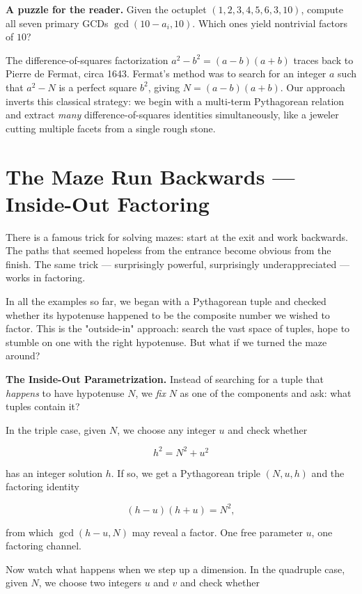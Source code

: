 \textbf{A puzzle for the reader.} Given the octuplet $(1, 2, 3, 4, 5, 6, 3, 10)$, compute all seven primary GCDs $\gcd(10 - a_i, 10)$. Which ones yield nontrivial factors of $10$?

The difference-of-squares factorization $a^2 - b^2 = (a - b)(a + b)$ traces back to Pierre de Fermat, circa 1643. Fermat's method was to search for an integer $a$ such that $a^2 - N$ is a perfect square $b^2$, giving $N = (a - b)(a + b)$. Our approach inverts this classical strategy: we begin with a multi-term Pythagorean relation and extract \textit{many} difference-of-squares identities simultaneously, like a jeweler cutting multiple facets from a single rough stone.


\ornbreak



\section{The Maze Run Backwards --- Inside-Out Factoring}


There is a famous trick for solving mazes: start at the exit and work backwards. The paths that seemed hopeless from the entrance become obvious from the finish. The same trick --- surprisingly powerful, surprisingly underappreciated --- works in factoring.

In all the examples so far, we began with a Pythagorean tuple and checked whether its hypotenuse happened to be the composite number we wished to factor. This is the "outside-in" approach: search the vast space of tuples, hope to stumble on one with the right hypotenuse. But what if we turned the maze around?

\textbf{The Inside-Out Parametrization.} Instead of searching for a tuple that \textit{happens} to have hypotenuse $N$, we \textit{fix} $N$ as one of the components and ask: what tuples contain it?

In the triple case, given $N$, we choose any integer $u$ and check whether

\[
h^2 = N^2 + u^2
\]

has an integer solution $h$. If so, we get a Pythagorean triple $(N, u, h)$ and the factoring identity

\[
(h - u)(h + u) = N^2,
\]

from which $\gcd(h - u, N)$ may reveal a factor. One free parameter $u$, one factoring channel.

Now watch what happens when we step up a dimension. In the quadruple case, given $N$, we choose two integers $u$ and $v$ and check whether

